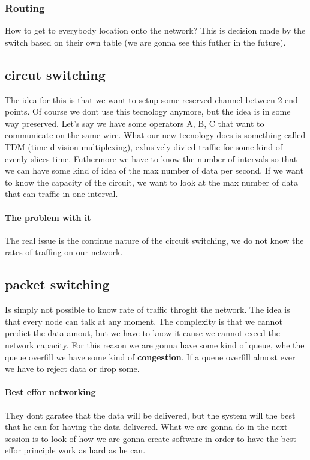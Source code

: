 \documentclass{article}
\begin{document}
        \subsubsection{Routing} 
          How to get to everybody location onto the network? This is decision made by the 
          switch based on their own table (we are gonna see this futher in the future).
        \subsection{circut switching}
          The idea for this is that we want to setup some reserved channel between 2 end 
          points. Of course we dont use this tecnology anymore, but the idea is in some way
          preserved. Let's say we have some operators A, B, C that want to communicate on the
          same wire. What our new tecnology does is something called TDM (time division 
          multiplexing), exlusively divied traffic for some kind of evenly slices time.
          Futhermore we have to know the number of intervals so that we can have some kind of
          idea of the max number of data per second. If we want to know the capacity of the
          circuit, we want to look at the max number of data that can traffic in one interval.
          \paragraph{The problem with it} The real issue is the continue nature of the 
            circuit switching, we do not know the rates of traffing on our network.
        \subsection{packet switching}
          Is simply not possible to know rate of traffic throght the network. The idea is
          that every node can talk at any moment. The complexity is that we cannot predict
          the data amout, but we have to know it cause we cannot exeed the network capacity.
          For this reason we are gonna have some kind of queue, whe the queue overfill we have
          some kind of \textbf{congestion}. If a queue overfill almost ever we have to reject
          data or drop some.
          \paragraph{Best effor networking} They dont garatee that the data will be delivered, 
            but the system will the best that he can for having the data delivered. What we 
            are gonna do in the next session is to look of how we are gonna create software  
            in order to have the best effor principle work as hard as he can.
\end{document}
